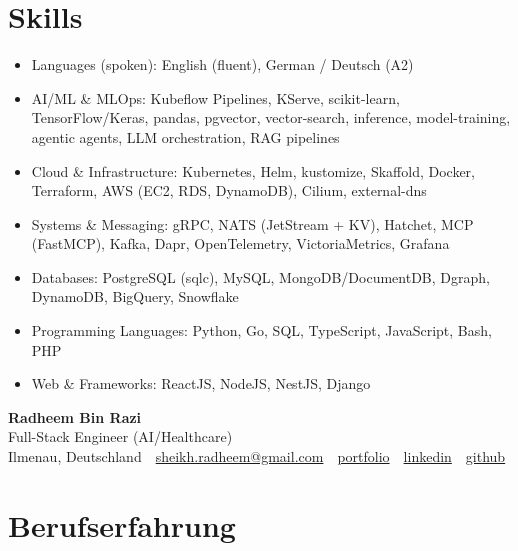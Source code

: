 \documentclass[10pt,a4paper]{resume}
\makeatletter
\newcommand{\Portfolio}{https://radheem.github.io/my-cv}
\newcommand{\PortfolioText}{portfolio}
\newcommand{\GitHub}{https://github.com/radheem}
\newcommand{\LinkedIn}{https://www.linkedin.com/in/radheem-razi}
\newcommand{\Email}{sheikh.radheem@gmail.com}
\makeatother
\begin{document}
\section{Skills}

\begin{itemize}[leftmargin=1.4em,nosep,topsep=2pt]
  \item Languages (spoken): English (fluent), German / Deutsch (A2)
  \item AI/ML \& MLOps: Kubeflow Pipelines, KServe, scikit-learn, TensorFlow/Keras, pandas, pgvector, vector-search, inference, model-training, agentic agents, LLM orchestration, RAG pipelines
  \item Cloud \& Infrastructure: Kubernetes, Helm, kustomize, Skaffold, Docker, Terraform, AWS (EC2, RDS, DynamoDB), Cilium, external-dns
  \item Systems \& Messaging: gRPC, NATS (JetStream + KV), Hatchet, MCP (FastMCP), Kafka, Dapr, OpenTelemetry, VictoriaMetrics, Grafana
  \item Databases: PostgreSQL (sqlc), MySQL, MongoDB/DocumentDB, Dgraph, DynamoDB, BigQuery, Snowflake
  \item Programming Languages: Python, Go, SQL, TypeScript, JavaScript, Bash, PHP
  \item Web \& Frameworks: ReactJS, NodeJS, NestJS, Django
\end{itemize}

\clearpage
{}

\begin{center}
  {\huge\bfseries Radheem Bin Razi}\\[3pt]
  {\large Full-Stack Engineer (AI/Healthcare)}\\[6pt]
  \small
  Ilmenau, Deutschland \,\textbar\,
  \href{mailto:\Email}{\Email} \,\textbar\,
  \href{\Portfolio}{\PortfolioText} \,\textbar\,
  \href{\LinkedIn}{linkedin} \,\textbar\,
  \href{\GitHub}{github}
\end{center}
\vspace{2pt}

\section{Berufserfahrung}
\end{document}
